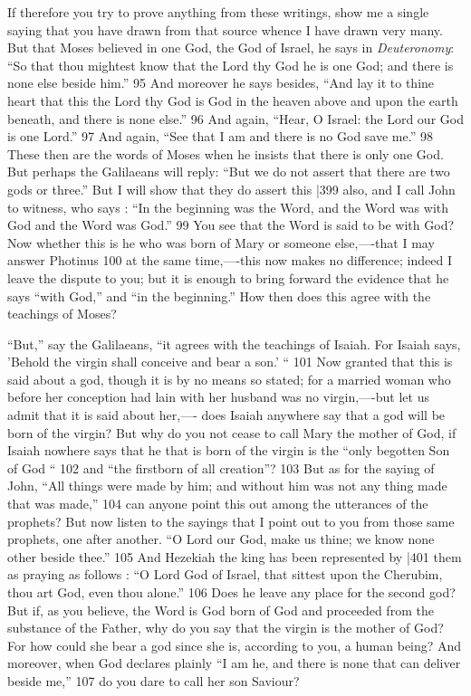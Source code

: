If therefore you try to prove anything from these writings, show me a single saying that you have drawn from that source whence I have drawn very many. But that Moses believed in one God, the God of Israel, he says in \emph{Deuteronomy}: ``So that thou mightest know that the Lord thy God he is one God; and there is none else beside him.''
95 And moreover he says besides, ``And lay it to thine heart that this the Lord thy God is God in the heaven above and upon the earth beneath, and there is none else.''
96 And again, ``Hear, O Israel: the Lord our God is one Lord.''
97 And again, ``See that I am and there is no God save me.''
98 These then are the words of Moses when he insists that there is only one God. But perhaps the Galilaeans will reply: ``But we do not assert that there are two gods or three.'' But I will show that they do assert this
|399 also, and I call John to witness, who says : ``In the beginning was the Word, and the Word was with God and the Word was God.''
99 You see that the Word is said to be with God? Now whether this is he who was born of Mary or someone else,----that I may answer Photinus
100 at the same time,----this now makes no difference; indeed I leave the dispute to you; but it is enough to bring forward the evidence that he says ``with God,'' and ``in the beginning.'' How then does this agree with the teachings of Moses?

``But,'' say the Galilaeans, ``it agrees with the teachings of Isaiah. For Isaiah says,
'Behold the virgin shall conceive and bear a son.' `` 101 Now granted that this is said about a god, though it is by no means so stated; for a married woman who before her conception had lain with her husband was no virgin,----but let us admit that it is said about her,---- does Isaiah anywhere say that a god will be born of the virgin? But why do you not cease to call Mary the mother of God, if Isaiah nowhere says that he that is born of the virgin is the ``only begotten Son of God ``
102 \emph{}and ``the firstborn of all creation''?
103 But as for the saying of John, ``All things were made by him; and without him was not any thing made that was made,''
104 can anyone point this out among the utterances of the prophets? But now listen to the sayings that I point out to you from those same prophets, one after another. ``O Lord our God, make us thine; we know none other beside thee.''
105 And Hezekiah the king has been represented by |401
them as praying as follows : ``O Lord God of Israel, that sittest upon the Cherubim, thou art God, even thou alone.''
106 Does he leave any place for the second god? But if, as you believe, the Word is God born of God and proceeded from the substance of the Father, why do you say that the virgin is the mother of God? For how could she bear a god since she is, according to you, a human being? And moreover, when God declares plainly ``I am he, and there is none that can deliver beside me,''
107 do you dare to call her son Saviour?

